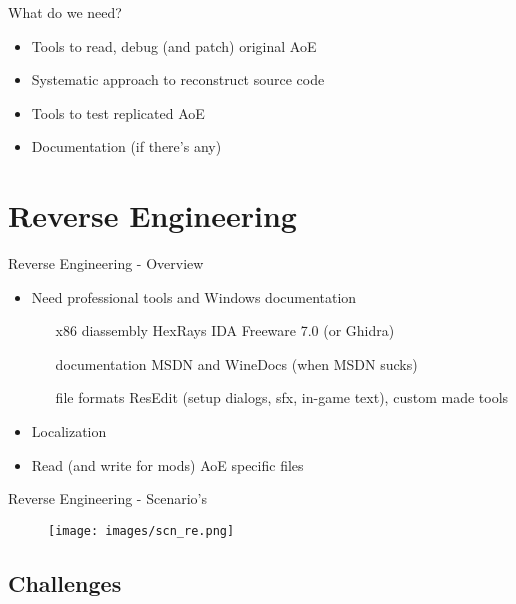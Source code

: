 \documentclass{beamer}
\begin{document}

\begin{frame}{What do we need?}
	\begin{itemize}
		\item Tools to read, debug (and patch) original AoE
		\item Systematic approach to reconstruct source code
		\item Tools to test replicated AoE
		\item Documentation (if there's any)
	\end{itemize}

\end{frame}


\section{Reverse Engineering}

\begin{frame}{Reverse Engineering - Overview}
	\begin{itemize}
		\item Need professional tools and Windows documentation
		\begin{itemize}
			\item[x86 diassembly] HexRays IDA Freeware 7.0 (or Ghidra)
			\item[documentation] MSDN and WineDocs (when MSDN sucks)
			\item[file formats] ResEdit (setup dialogs, sfx, in-game text), custom made tools
		\end{itemize}
		\item Localization
		\item Read (and write for mods) AoE specific files
	\end{itemize}
\end{frame}

\begin{frame}{Reverse Engineering - Scenario's}
	\begin{figure}
	\texttt{[image: images/scn\_re.png]}
	\end{figure}
\end{frame}


\subsection{Challenges}
\end{document}
